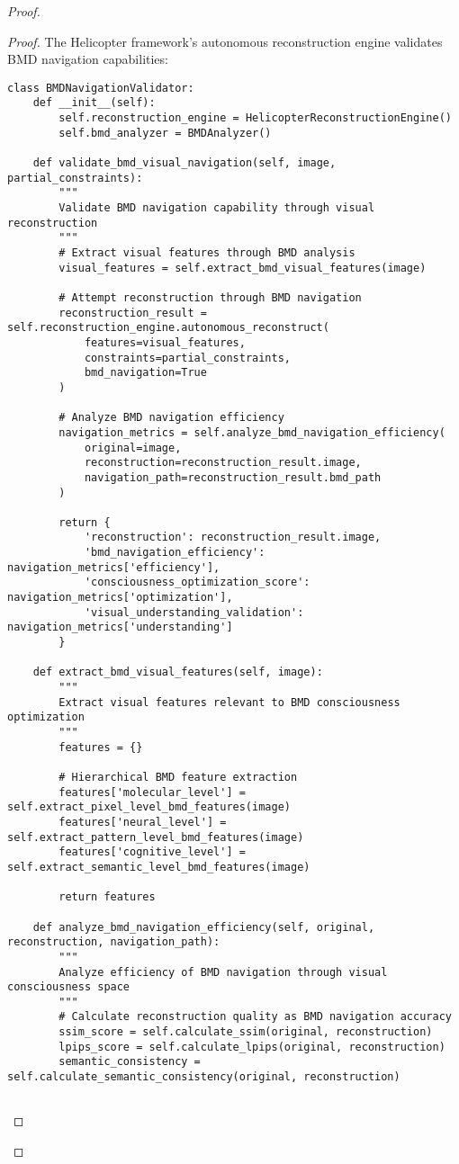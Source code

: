 \documentclass[12pt,a4paper]{article}
\begin{document}
\begin{proof}
{\begin{proof}
The Helicopter framework's autonomous reconstruction engine validates BMD navigation capabilities:

\begin{lstlisting}[style=pythonstyle, caption=BMD Navigation Validation Through Visual Reconstruction]
class BMDNavigationValidator:
    def __init__(self):
        self.reconstruction_engine = HelicopterReconstructionEngine()
        self.bmd_analyzer = BMDAnalyzer()
        
    def validate_bmd_visual_navigation(self, image, partial_constraints):
        """
        Validate BMD navigation capability through visual reconstruction
        """
        # Extract visual features through BMD analysis
        visual_features = self.extract_bmd_visual_features(image)
        
        # Attempt reconstruction through BMD navigation
        reconstruction_result = self.reconstruction_engine.autonomous_reconstruct(
            features=visual_features,
            constraints=partial_constraints,
            bmd_navigation=True
        )
        
        # Analyze BMD navigation efficiency
        navigation_metrics = self.analyze_bmd_navigation_efficiency(
            original=image,
            reconstruction=reconstruction_result.image,
            navigation_path=reconstruction_result.bmd_path
        )
        
        return {
            'reconstruction': reconstruction_result.image,
            'bmd_navigation_efficiency': navigation_metrics['efficiency'],
            'consciousness_optimization_score': navigation_metrics['optimization'],
            'visual_understanding_validation': navigation_metrics['understanding']
        }
    
    def extract_bmd_visual_features(self, image):
        """
        Extract visual features relevant to BMD consciousness optimization
        """
        features = {}
        
        # Hierarchical BMD feature extraction
        features['molecular_level'] = self.extract_pixel_level_bmd_features(image)
        features['neural_level'] = self.extract_pattern_level_bmd_features(image)
        features['cognitive_level'] = self.extract_semantic_level_bmd_features(image)
        
        return features
    
    def analyze_bmd_navigation_efficiency(self, original, reconstruction, navigation_path):
        """
        Analyze efficiency of BMD navigation through visual consciousness space
        """
        # Calculate reconstruction quality as BMD navigation accuracy
        ssim_score = self.calculate_ssim(original, reconstruction)
        lpips_score = self.calculate_lpips(original, reconstruction)
        semantic_consistency = self.calculate_semantic_consistency(original, reconstruction)
        

\end{lstlisting}
\end{proof}}
\end{proof}
\end{document}
